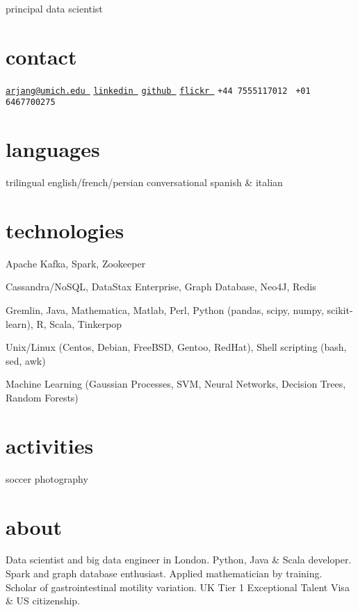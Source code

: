 \documentclass[10pt,twoside]{friggeri-cv}
\begin{document}
       {principal data scientist}


\begin{aside}
  \section{contact}
    \href{mailto:arjang@umich.edu}{\scriptsize  \texttt{arjang@umich.edu \faEnvelope}}
    \href{https://www.linkedin.com/in/arjang-talattof-a974845a/}{\scriptsize  \texttt{linkedin }}
    \href{http://arjology.github.io}{\scriptsize  \texttt{github }}
    \href{http://www.flickr.com/photos/talattof}{\scriptsize  \texttt{flickr }}
    \scriptsize  \texttt{+44 7555117012 \faPhone}
    \scriptsize  \texttt{+01 6467700275 \faPhone}
  \section{languages}
    \scriptsize trilingual english/french/persian
    \scriptsize conversational spanish \& italian
  \section{technologies}
    \item Apache Kafka, Spark, Zookeeper
    \item Cassandra/NoSQL, DataStax Enterprise, Graph Database, Neo4J, Redis
    \item Gremlin, Java, Mathematica, Matlab, Perl, Python (pandas, scipy, numpy, scikit-learn), R, Scala, Tinkerpop
    \item Unix/Linux (Centos, Debian, FreeBSD, Gentoo, RedHat), Shell scripting (bash, sed, awk)
    \item Machine Learning (Gaussian Processes, SVM, Neural Networks, Decision Trees, Random Forests)
  \section{activities}
    soccer {\scriptsize {}}
    photography {\scriptsize {}}
\end{aside}

\section{about}

Data scientist and big data engineer in London. Python, Java \& Scala developer. Spark and graph database
enthusiast. Applied mathematician by training. Scholar of gastrointestinal motility variation. UK Tier 1 Exceptional Talent Visa \& US citizenship.
\end{document}
